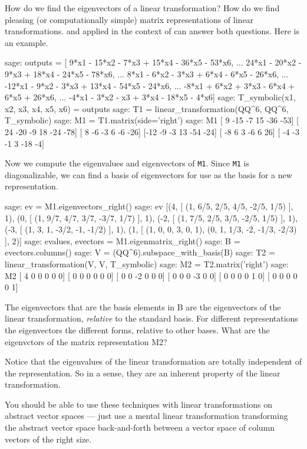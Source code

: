 How do we find the eigenvectors of a linear transformation?  How do we find pleasing (or computationally simple) matrix representations of linear transformations.   and  applied in the context of  can answer both questions.  Here is an example.
%
\begin{sageexample}
sage: outputs = [  9*x1 - 15*x2 - 7*x3 + 15*x4 - 36*x5 - 53*x6,
...               24*x1 - 20*x2 - 9*x3 + 18*x4 - 24*x5 - 78*x6,
...                8*x1 -  6*x2 - 3*x3 +  6*x4 -  6*x5 - 26*x6,
...              -12*x1 -  9*x2 - 3*x3 + 13*x4 - 54*x5 - 24*x6,
...               -8*x1 +  6*x2 + 3*x3 -  6*x4 +  6*x5 + 26*x6,
...               -4*x1 -  3*x2 -   x3 +  3*x4 - 18*x5 -  4*x6]
sage: T_symbolic(x1, x2, x3, x4, x5, x6) = outputs
sage: T1 = linear_transformation(QQ^6, QQ^6, T_symbolic)
sage: M1 = T1.matrix(side='right')
sage: M1
[  9 -15  -7  15 -36 -53]
[ 24 -20  -9  18 -24 -78]
[  8  -6  -3   6  -6 -26]
[-12  -9  -3  13 -54 -24]
[ -8   6   3  -6   6  26]
[ -4  -3  -1   3 -18  -4]
\end{sageexample}
%
Now we compute the eigenvalues and eigenvectors of \verb?M1?.  Since \verb?M1? is diagonalizable, we can find a basis of eigenvectors for use as the basis for a new representation.
%
\begin{sageexample}
sage: ev = M1.eigenvectors_right()
sage: ev
[(4, [
(1, 6/5, 2/5, 4/5, -2/5, 1/5)
], 1), (0, [
(1, 9/7, 4/7, 3/7, -3/7, 1/7)
], 1), (-2, [
(1, 7/5, 2/5, 3/5, -2/5, 1/5)
], 1), (-3, [
(1, 3, 1, -3/2, -1, -1/2)
], 1), (1, [
(1, 0, 0, 3, 0, 1),
(0, 1, 1/3, -2, -1/3, -2/3)
], 2)]
sage: evalues, evectors = M1.eigenmatrix_right()
sage: B = evectors.columns()
sage: V = (QQ^6).subspace_with_basis(B)
sage: T2 = linear_transformation(V, V, T_symbolic)
sage: M2 = T2.matrix('right')
sage: M2
[ 4  0  0  0  0  0]
[ 0  0  0  0  0  0]
[ 0  0 -2  0  0  0]
[ 0  0  0 -3  0  0]
[ 0  0  0  0  1  0]
[ 0  0  0  0  0  1]
\end{sageexample}
%
The eigenvectors that are the basis elements in B are the eigenvectors of the linear transformation, \emph{relative} to the standard basis.  For different representations the eigenvectors tke different forms, relative to other bases.  What are the eigenvctors of the matrix representation M2?\par
%
Notice that the eigenvalues of the linear transformation are totally independent of the representation.  So in a sense, they are an inherent property of the linear transformation.\par
%
You should be able to use these techniques with linear transformations on abstract vector spaces --- just use a mental linear transformation transforming the abstract vector space back-and-forth between a vector space of column vectors of the right size.
%
\begin{sageverbatim}
\end{sageverbatim}
%
